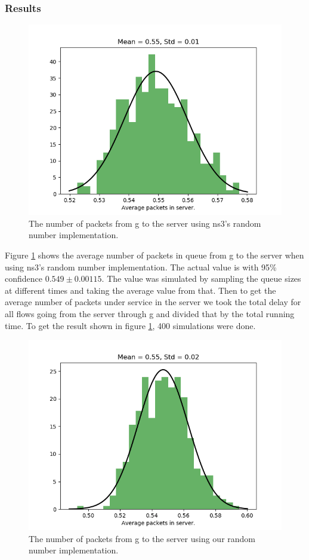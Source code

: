 \documentclass{article}
\begin{document}
\subsubsection{Results}
\begin{figure}[!htbp]
    \centering
    \includegraphics[width=0.85\linewidth]{ns3_gs_queue_size.png}
    \caption{The number of packets from g to the server using ns3's random number implementation.}
    \label{fig:GtoServerNs3}
\end{figure}

Figure \ref{fig:GtoServerNs3} shows the average number of packets in queue from g to the server when using ns3's random number implementation.
The actual value is with 95\% confidence $0.549 \pm 0.00115$.
The value was simulated by sampling the queue sizes at different times and taking the average value from that.
Then to get the average number of packets under service in the server we took the total delay for all flows going from the server through g and divided that by the total running time.
To get the result shown in figure \ref{fig:GtoServerNs3}, 400 simulations were done.


\begin{figure}[!htbp]
    \centering
    \includegraphics[width=0.85\linewidth]{our_gs_queue_size.png}
    \caption{The number of packets from g to the server using our random number implementation.}
    \label{fig:GtoServerOur}
\end{figure}
\end{document}
